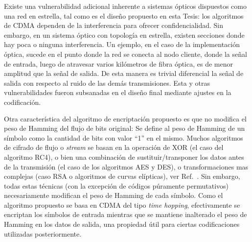 Existe una vulnerabilidad adicional inherente a sistemas ópticos dispuestos como una red en estrella, tal como es el diseño propuesto en esta Tesis: los algoritmos de CDMA dependen de la interferencia para ofrecer confidencialidad. Sin embargo, en un sistema óptico con topología en estrella, existen secciones donde hay poca o ninguna interferencia. Un ejemplo, en el caso de la implementación óptica, sucede en el punto donde la red se conecta al nodo cliente, donde la señal de entrada, luego de atravesar varios kilómetros de fibra óptica, es de menor amplitud que la señal de salida. De esta manera es trivial diferencial la señal de salida con respecto al ruido de las demás transmisiones.   
Esta y otras vulnerabilidades fueron subsanadas en el diseño final mediante ajustes en la codificación.

Otra característica del algoritmo de encriptación propuesto es que no modifica el peso de Hamming del flujo de bits original:
Se define al peso de Hamming de un símbolo como la cantidad de bits con valor ``1'' en el mismo. 
Muchos algoritmos de cifrado de flujo o \textit{stream} se basan en la operación de XOR (el caso del algoritmo RC4), o bien una combinación de sustituir/transponer los datos antes de la transmisión (el caso de los algoritmos AES y DES), o transformaciones mas complejas (caso RSA o algoritmos de curvas elípticas), ver Ref.~\cite{Menezes:1996:HAC:548089}.
Sin embargo, todas estas técnicas (con la excepción de códigos púramente permutativos) necesariamente modifican el peso de Hamming de cada símbolo. %
Como el algoritmo propuesto se basa en CDMA del tipo \textit{time hopping}, efectivamente se encriptan los símbolos de entrada mientras que se mantiene inalterado el peso de Hamming en los datos de salida, una propiedad útil para ciertas codificaciones utilizadas posteriormente. %

